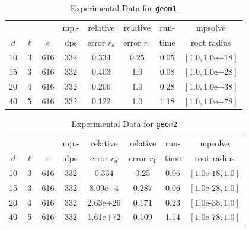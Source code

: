 \documentclass[runningheads]{llncs}
\begin{document}
\begin{table}
\caption{Experimental Data for \texttt{geom1}} %
\label{tab:geom1}
\vskip -0.15in
\begin{center}
\begin{small}
\begin{sc}
\begin{tabular}{rccccccc}
\toprule
&  &  & mp.-& relative  & relative & run- & mpsolve \\
$d~$& $\ell$& $e$ & dps&error $r_d$       & error $r_1$ &time& root radius\\
\midrule
 10 & 3 & 616 & 332 & 0.334 & 0.25 & 0.05 & $[1.0, 1.0\text{e+}18]$\\
 15 & 3 & 616 & 332 & 0.403 & 1.0 & 0.08 & $[1.0, 1.0\text{e+}28]$\\
 20 & 4 & 616 & 332 & 0.206 & 1.0 & 0.28 & $[1.0, 1.0\text{e+}38]$\\
 40 & 5 & 616 & 332 & 0.122 & 1.0 & 1.18 & $[1.0, 1.0\text{e+}78]$\\
\bottomrule
\end{tabular}
\end{sc}
\end{small}
\end{center}
\vskip 0.05in
\end{table}

\begin{table}
\caption{Experimental Data for \texttt{geom2}} %
\label{tab:geom2}
\vskip -0.15in
\begin{center}
\begin{small}
\begin{sc}
\begin{tabular}{rccccccc}
\toprule
&  &  & mp.-& relative  & relative & run- & mpsolve \\
$d~$& $\ell$& $e$ & dps&error $r_d$       & error $r_1$ &time& root radius\\
\midrule
 10 & 3 & 616 & 332 & 0.334 & 0.25 & 0.06 & $[1.0\text{e-}18, 1.0]$\\
 15 & 3 & 616 & 332 & 8.09e+4 & 0.287 & 0.06 & $[1.0\text{e-}28, 1.0]$\\
 20 & 4 & 616 & 332 & 2.63e+26 & 0.171 & 0.23 & $[1.0\text{e-}38, 1.0]$\\
 40 & 5 & 616 & 332 & 1.61e+72 & 0.109 & 1.14 & $[1.0\text{e-}78, 1.0]$\\
\bottomrule
\end{tabular}
\end{sc}
\end{small}
\end{center}
\vskip 0.05in
\end{table}
\end{document}
